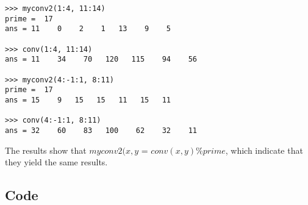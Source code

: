 \documentclass{article}
\begin{document}
\begin{lstlisting}
>>> myconv2(1:4, 11:14)
prime =  17
ans = 11    0    2    1   13    9    5

>>> conv(1:4, 11:14)
ans = 11    34    70   120   115    94    56

>>> myconv2(4:-1:1, 8:11)
prime =  17
ans = 15    9   15   15   11   15   11

>>> conv(4:-1:1, 8:11)
ans = 32    60    83   100    62    32    11
\end{lstlisting}
The results show that $myconv2(x,y$ = $conv(x,y) \% prime$, which indicate that they yield the same results.

\subsection{Code}
 
\end{document}
